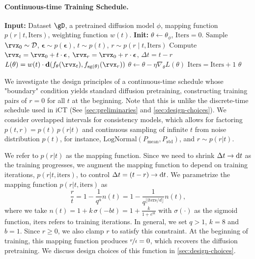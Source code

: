 \documentclass{article}
\begin{document}
\paragraph{Continuous-time Training Schedule.}

\begin{algorithm}
\caption{Easy Consistency Tuning (ECT)}
\label{alg:ect}
\begin{algorithmic}[t]
\State \textbf{Input:} Dataset $\gD$, a pretrained diffusion model $\phi$, mapping function $p(r \mid t, \mathrm{Iters})$, weighting function $w(t)$.
\State \textbf{Init:} $\theta \leftarrow \theta_{\phi}$, $\mathrm{Iters} = 0$.
\Repeat
    \State $\mathrm{Sample}$ $\x_0 \sim \mathcal{D}$, $\boldsymbol{\epsilon} \sim p(\boldsymbol{\epsilon})$, $t \sim p(t)$, $r \sim p(r \mid t, \mathrm{Iters})$
    \State $\mathrm{Compute}$ $\x_t = \x_0 + t \cdot \boldsymbol{\epsilon}$, $\x_r = \x_0 + r \cdot \boldsymbol{\epsilon}$, $\Delta t = t-r$
    \State $L(\theta) = w(t) \cdot \dist(f_\theta(\x_t), f_{\operatorname{sg}(\theta)}(\x_r))$ 
    \State $\theta \leftarrow \theta - \eta \nabla_\theta L(\theta)$
    \State $\mathrm{Iters} = \mathrm{Iters} + 1$
\Return $\theta$ 
\end{algorithmic}
\end{algorithm}
\vspace{-5pt}
%
We investigate the design principles of a continuous-time schedule whose "boundary" condition yields standard diffusion pretraining, \ie constructing training pairs of $r=0$ for all $t$ at the beginning. Note that this is unlike the discrete-time schedule used in iCT (See \cref{sec:preliminaries} and \cref{sec:design-choices}). 
% 
We consider overlapped intervals for consistency models, which allows for factoring $p(t, r) = p(t) \, p(r|t)$ and continuous sampling of infinite $t$ from noise distribution $p(t)$, for instance, $\mathrm{LogNormal}(P_{\text{mean}}, P_{\text{std}})$, and $r \sim p(r | t)$. 

We refer to $p(r | t)$ as the mapping function. 
Since we need to shrink $\Delta t \to {\mathrm{d}} t$ as the training progresses, we augment the mapping function to depend on training iterations, $p(r|t, \text{iters})$, to control $\Delta t = (t - r) \to {\mathrm{d}} t$.
We parametrize the mapping function $p(r|t, \text{iters})$ as
%
\begin{equation}  
\frac{r}{t}  
= 1 - \frac{1}{q^a} n(t)
= 1 - \frac{1}{q^{\lfloor\mathrm{iters}/d\rfloor}} n(t),
\label{eq:mapping-fn}
\end{equation}
%
where we take $n(t) = 1 + k \,\sigma(-bt) = 1 + \frac{k}{1 + e^{bt}}$ with $\sigma(\cdot)$ as the sigmoid function, $\mathrm{iters}$ refers to training iterations. In general, we set $q > 1$, $k=8$ and $b=1$. 
Since $r\geq0$, we also clamp $r$ to satisfy this constraint.
At the beginning of training, this mapping function produces $\nicefrac{r}{t} = 0$, which recovers the diffusion pretraining.
%
We discuss design choices of this function in \cref{sec:design-choices}.
\end{document}
